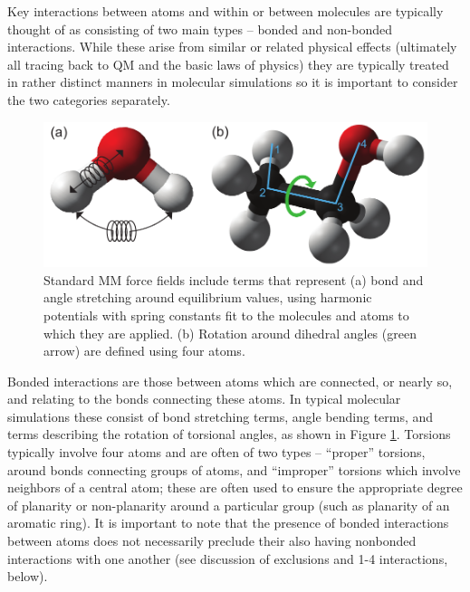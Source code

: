 \documentclass[9pt,bestpractices]{livecoms}
\begin{document}
Key interactions between atoms and within or between molecules are typically thought of as consisting of two main types -- bonded and non-bonded interactions. 
While these arise from similar or related physical effects (ultimately all tracing back to QM and the basic laws of physics) they are typically treated in rather distinct manners in molecular simulations so it is important to consider the two categories
separately.

\begin{figure}[h]
\centering
\includegraphics[width=\linewidth]{potentials_basic_horiz.pdf}
\caption{Standard MM force fields include terms that represent (a) bond and angle stretching around equilibrium values, using harmonic potentials with spring constants fit to the molecules and atoms to which they are applied. (b) Rotation around dihedral angles (green arrow) are defined using four atoms.}
\label{potentials}
\end{figure}

Bonded interactions are those between atoms which are connected, or nearly so, and relating to the bonds connecting these atoms. 
In typical molecular simulations these consist of bond stretching terms, angle bending terms, and terms describing the rotation of torsional angles, as shown in Figure \ref{potentials}. 
Torsions typically involve four atoms and are often of two types -- ``proper'' torsions, around bonds connecting groups of atoms, and ``improper''
torsions which involve neighbors of a central atom; these are often used to ensure the appropriate degree of planarity or non-planarity around a particular group (such as planarity of an aromatic ring). 
It is important to note that the presence of bonded interactions between atoms does not necessarily preclude their also having nonbonded interactions with one another (see discussion of exclusions and 1-4 interactions, below).
\end{document}
